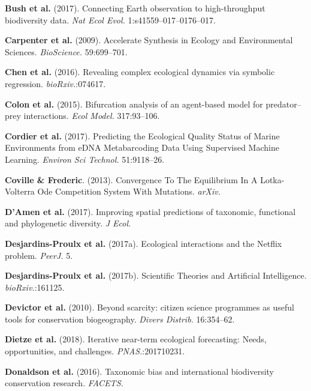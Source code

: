 \documentclass[12pt]{article}
\begin{document}
\leavevmode\hypertarget{ref-BushSoll17}{}%
\textbf{Bush et al.} (2017). Connecting Earth observation to
high-throughput biodiversity data. \emph{Nat Ecol Evol.}
1:s41559--017--0176--017.

\leavevmode\hypertarget{ref-CarpArmb09}{}%
\textbf{Carpenter et al.} (2009). Accelerate Synthesis in Ecology and
Environmental Sciences. \emph{BioScience.} 59:699--701.

\leavevmode\hypertarget{ref-ChenAngu16}{}%
\textbf{Chen et al.} (2016). Revealing complex ecological dynamics via
symbolic regression. \emph{bioRxiv.}:074617.

\leavevmode\hypertarget{ref-ColoClae15}{}%
\textbf{Colon et al.} (2015). Bifurcation analysis of an agent-based
model for predator--prey interactions. \emph{Ecol Model.} 317:93--106.

\leavevmode\hypertarget{ref-CordEsli17}{}%
\textbf{Cordier et al.} (2017). Predicting the Ecological Quality Status
of Marine Environments from eDNA Metabarcoding Data Using Supervised
Machine Learning. \emph{Environ Sci Technol.} 51:9118--26.

\leavevmode\hypertarget{ref-CoviFred13}{}%
\textbf{Coville \& Frederic}. (2013). Convergence To The Equilibrium In
A Lotka-Volterra Ode Competition System With Mutations. \emph{arXiv.}

\leavevmode\hypertarget{ref-DAmMate17}{}%
\textbf{D'Amen et al.} (2017). Improving spatial predictions of
taxonomic, functional and phylogenetic diversity. \emph{J Ecol.}

\leavevmode\hypertarget{ref-DesjLaig17}{}%
\textbf{Desjardins-Proulx et al.} (2017a). Ecological interactions and
the Netflix problem. \emph{PeerJ.} 5.

\leavevmode\hypertarget{ref-DesjPois17}{}%
\textbf{Desjardins-Proulx et al.} (2017b). Scientific Theories and
Artificial Intelligence. \emph{bioRxiv.}:161125.

\leavevmode\hypertarget{ref-DeviWhit10}{}%
\textbf{Devictor et al.} (2010). Beyond scarcity: citizen science
programmes as useful tools for conservation biogeography. \emph{Divers
Distrib.} 16:354--62.

\leavevmode\hypertarget{ref-DietFox18}{}%
\textbf{Dietze et al.} (2018). Iterative near-term ecological
forecasting: Needs, opportunities, and challenges.
\emph{PNAS.}:201710231.

\leavevmode\hypertarget{ref-DonaBurn16}{}%
\textbf{Donaldson et al.} (2016). Taxonomic bias and international
biodiversity conservation research. \emph{FACETS.}
\end{document}
